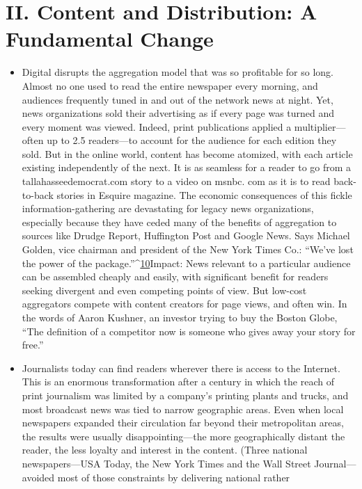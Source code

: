 \section{II. Content and Distribution: A Fundamental Change}
\begin{itemize}
\item Digital disrupts the aggregation model that was so profitable for so
long. Almost no one used to read the entire newspaper every morning,
and audiences frequently tuned in and out of the network news at night.
Yet, news organizations sold their advertising as if every page was turned
and every moment was viewed. Indeed, print publications applied a multiplier—
often up to 2.5 readers—to account for the audience for each
edition they sold. But in the online world, content has become atomized,
with each article existing independently of the next. It is as seamless for a
reader to go from a tallahasseedemocrat.com story to a video on msnbc.
com as it is to read back-to-back stories in Esquire magazine. The economic
consequences of this fickle information-gathering are devastating
for legacy news organizations, especially because they have ceded many
of the benefits of aggregation to sources like Drudge Report, Huffington
Post and Google News. Says Michael Golden, vice chairman and president
of the New York Times Co.: ``We've lost the power of the package.''^{\href{#endnotes-chapter-1}{10}}Impact: News relevant to a particular audience can be assembled cheaply
and easily, with significant benefit for readers seeking divergent and even
competing points of view. But low-cost aggregators compete with content
creators for page views, and often win. In the words of Aaron Kushner, an
investor trying to buy the Boston Globe, ``The definition of a competitor
now is someone who gives away your story for free.''
\item Journalists today can find readers wherever there is access to the Internet.
This is an enormous transformation after a century in which the
reach of print journalism was limited by a company's printing plants and
trucks, and most broadcast news was tied to narrow geographic areas. Even
when local newspapers expanded their circulation far beyond their metropolitan
areas, the results were usually disappointing—the more geographically
distant the reader, the less loyalty and interest in the content. (Three
national newspapers—USA Today, the New York Times and the Wall Street
Journal—avoided most of those constraints by delivering national rather

\end{itemize}
